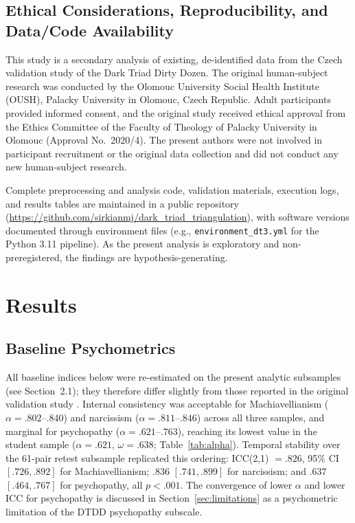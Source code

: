 \documentclass[11pt,twocolumn]{article}
\begin{document}
\subsection{Ethical Considerations, Reproducibility, and Data/Code Availability}

This study is a secondary analysis of existing, de-identified data from the Czech validation study of the Dark Triad Dirty Dozen. The original human-subject research was conducted by the Olomouc University Social Health Institute (OUSH), Palacky University in Olomouc, Czech Republic. Adult participants provided informed consent, and the original study received ethical approval from the Ethics Committee of the Faculty of Theology of Palacky University in Olomouc (Approval No.\ 2020/4). The present authors were not involved in participant recruitment or the original data collection and did not conduct any new human-subject research.

Complete preprocessing and analysis code, validation materials, execution logs, and results tables are maintained in a public repository (\url{https://github.com/sirkianmj/dark_triad_triangulation}), with software versions documented through environment files (e.g., \texttt{environment\_dt3.yml} for the Python 3.11 pipeline). As the present analysis is exploratory and non-preregistered, the findings are hypothesis-generating.

\section{Results}

\subsection{Baseline Psychometrics}
\label{sec:baseline}

All baseline indices below were re-estimated on the present analytic subsamples (see Section~2.1); they therefore differ slightly from those reported in the original validation study \citep{zivna2025}. Internal consistency was acceptable for Machiavellianism ($\alpha = .802$--$.840$) and narcissism ($\alpha = .811$--$.846$) across all three samples, and marginal for psychopathy ($\alpha = .621$--$.763$), reaching its lowest value in the student sample ($\alpha = .621$, $\omega = .638$; Table~\ref{tab:alpha}). Temporal stability over the 61-pair retest subsample replicated this ordering: ICC(2,1) $= .826$, 95\% CI $[.726, .892]$ for Machiavellianism; $.836$ $[.741, .899]$ for narcissism; and $.637$ $[.464, .767]$ for psychopathy, all $p < .001$. The convergence of lower $\alpha$ and lower ICC for psychopathy is discussed in Section~\ref{sec:limitations} as a psychometric limitation of the DTDD psychopathy subscale.
\end{document}

